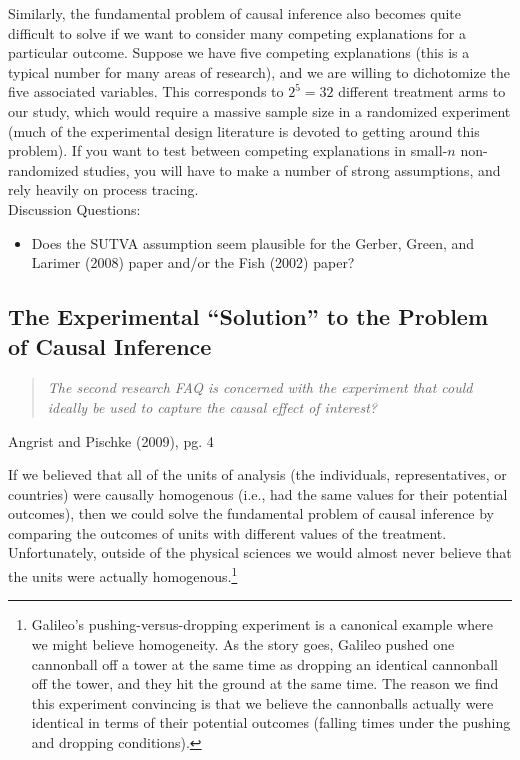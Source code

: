 \documentclass{article}
\begin{document}
Similarly, the fundamental problem of causal inference also becomes quite difficult to solve if we want to consider many competing explanations for a particular outcome. Suppose we have five competing explanations (this is a typical number for many areas of research), and we are willing to dichotomize the five associated variables. This corresponds to $2^5=32$ different treatment arms to our study, which would require a massive sample size in a randomized experiment (much of the experimental design literature is devoted to getting around this problem). If you want to test between competing explanations in small-$n$ non-randomized studies, you will have to make a number of strong assumptions, and rely heavily on process tracing.  \\


\single
\noindent Discussion Questions:
\begin{itemize}
\item Does the SUTVA assumption seem plausible for the Gerber, Green, and Larimer (2008) paper and/or the Fish (2002) paper?
\end{itemize}
\double

\clearpage

\subsection{The Experimental ``Solution'' to the Problem of Causal Inference}


\begin{quote}
{\it The second research FAQ is concerned with the experiment that could ideally be used to capture the causal effect of interest?}
\end{quote}
\begin{center}
Angrist and Pischke (2009), pg. 4
\end{center}


If we believed that all of the units of analysis (the individuals, representatives, or countries) were causally homogenous (i.e., had the same values for their potential outcomes), then we could solve the fundamental problem of causal inference by comparing the outcomes of units with different values of the treatment. Unfortunately, outside of the physical sciences we would almost never believe that the units were actually homogenous.\footnote{Galileo's pushing-versus-dropping experiment is a canonical example where we might believe homogeneity. As the story goes, Galileo pushed one cannonball off a tower at the same time as dropping an identical cannonball off the tower, and they hit the ground at the same time. The reason we find this experiment convincing is that we believe the cannonballs actually were identical in terms of their potential outcomes (falling times under the pushing and dropping conditions).} 
\end{document}
